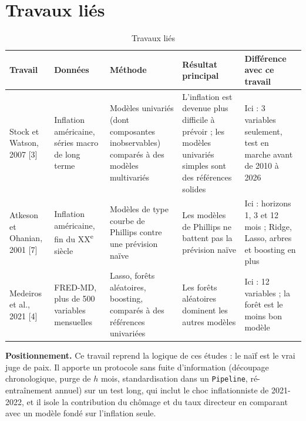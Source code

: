 \documentclass[11pt,a4paper]{article}
\begin{document}
\section{Travaux liés}
\begin{table}[H]\centering\small
\caption{Travaux liés}\label{tab:lies}
\begin{tabular}{@{}p{2.3cm}p{2.7cm}p{3.1cm}p{3.2cm}p{3cm}@{}}
\toprule
Travail & Données & Méthode & Résultat principal & Différence avec ce travail\\\midrule
Stock et Watson, 2007 [3] & Inflation américaine, séries macro de long terme & Modèles univariés (dont composantes inobservables) comparés à des modèles multivariés & L'inflation est devenue plus difficile à prévoir ; les modèles univariés simples sont des références solides & Ici : 3 variables seulement, test en marche avant de 2010 à 2026\\
Atkeson et Ohanian, 2001 [7] & Inflation américaine, fin du XX\textsuperscript{e} siècle & Modèles de type courbe de Phillips contre une prévision naïve & Les modèles de Phillips ne battent pas la prévision naïve & Ici : horizons 1, 3 et 12 mois ; Ridge, Lasso, arbres et boosting en plus\\
Medeiros et al., 2021 [4] & FRED-MD, plus de 500 variables mensuelles & Lasso, forêts aléatoires, boosting, comparés à des références univariées & Les forêts aléatoires dominent les autres modèles & Ici : 12 variables ; la forêt est le moins bon modèle\\
\bottomrule
\end{tabular}
\end{table}
\textbf{Positionnement.} Ce travail reprend la logique de ces études : le naïf est le vrai juge de paix. Il apporte un protocole sans fuite d'information (découpage chronologique, purge de $h$ mois, standardisation dans un \texttt{Pipeline}, ré-entraînement annuel) sur un test long, qui inclut le choc inflationniste de 2021-2022, et il isole la contribution du chômage et du taux directeur en comparant avec un modèle fondé sur l'inflation seule.

\end{document}
